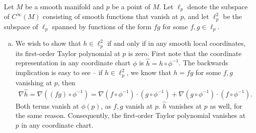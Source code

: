 \documentclass{../../mathnotes}
\begin{document}
Let $M$ be a smooth manifold and $p$ be a point of $M$. Let $\ell_p$ denote the subspace of $C^\infty(M)$ consisting of smooth functions
that vanish at $p$, and let $\ell_p^2$ be the subspace of $\ell_p$ spanned by functions of the form $fg$ for some $f,g\in\ell_p$.
\begin{enumerate}[(a)]
    \item We wish to show that $h\in\ell^2_p$ if and only if in any smooth local coordinates, its first-order Taylor
        polynomial at $p$ is zero. First note that the coordinate representation in any coordinate chart $\phi$ is $\hat h=h\circ\phi^{-1}$.
        The backwards implication is easy to see -- if $h\in\ell^2_p$, we know that $h=fg$ for some $f,g$ vanishing at $p$, then
        \begin{align*}
            \nabla\hat h=\nabla\left( (fg)\circ\phi^{-1} \right)=\nabla(f\circ\phi^{-1})\cdot (g\circ\phi^{-1})+\nabla(g\circ\phi^{-1})\cdot (f\circ\phi^{-1}).
        \end{align*}
        Both terms vanish at $\phi(p)$, as $f,g$ vanish at $p$. $\hat h$ vanishes at $p$ as well, for the same reason.
        Consequently, the first-order Taylor polynomial vanishes at $p$ in any coordinate chart.


\end{enumerate}
\end{document}
